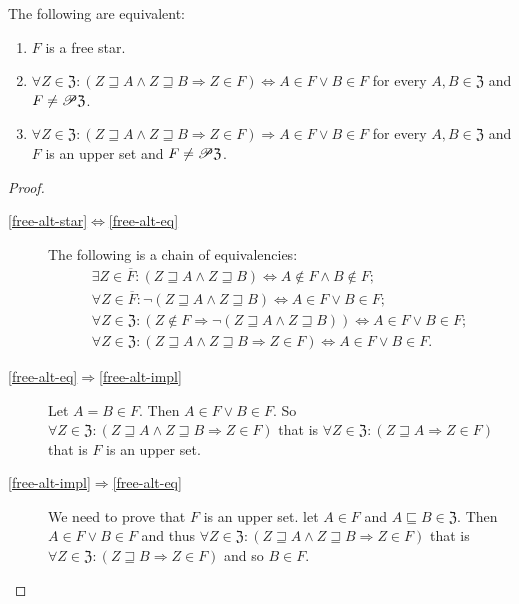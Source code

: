 \begin{prop}
The following are equivalent:
\begin{enumerate}
\item \label{free-alt-star}$F$ is a free star.
\item \label{free-alt-eq}$\forall Z\in\mathfrak{Z}:(Z\sqsupseteq A\wedge Z\sqsupseteq B\Rightarrow Z\in F)\Leftrightarrow A\in F\vee B\in F$
for every $A,B\in\mathfrak{Z}$ and $F\neq\mathscr{P}\mathfrak{Z}$.
\item \label{free-alt-impl}$\forall Z\in\mathfrak{Z}:(Z\sqsupseteq A\wedge Z\sqsupseteq B\Rightarrow Z\in F)\Rightarrow A\in F\vee B\in F$
for every $A,B\in\mathfrak{Z}$ and $F$ is an upper set and $F\neq\mathscr{P}\mathfrak{Z}$.
\end{enumerate}
\end{prop}
\begin{proof}
~
\begin{description}
\item [{\ref{free-alt-star}$\Leftrightarrow$\ref{free-alt-eq}}] The following
is a chain of equivalencies:
\begin{gather*}
\exists Z\in\overline{F}:(Z\sqsupseteq A\wedge Z\sqsupseteq B)\Leftrightarrow A\notin F\wedge B\notin F;\\
\forall Z\in\overline{F}:\neg(Z\sqsupseteq A\wedge Z\sqsupseteq B)\Leftrightarrow A\in F\vee B\in F;\\
\forall Z\in\mathfrak{Z}:(Z\notin F\Rightarrow\neg(Z\sqsupseteq A\wedge Z\sqsupseteq B))\Leftrightarrow A\in F\vee B\in F;\\
\forall Z\in\mathfrak{Z}:(Z\sqsupseteq A\wedge Z\sqsupseteq B\Rightarrow Z\in F)\Leftrightarrow A\in F\vee B\in F.
\end{gather*}

\item [{\ref{free-alt-eq}$\Rightarrow$\ref{free-alt-impl}}]
Let $A=B\in F$. Then $A\in F\lor B\in F$. So $\forall Z\in\mathfrak{Z}:(Z\sqsupseteq A\wedge Z\sqsupseteq B\Rightarrow Z\in F)$
that is $\forall Z\in\mathfrak{Z}:(Z\sqsupseteq A\Rightarrow Z\in F)$ that is $F$ is an upper set.

\item [{\ref{free-alt-impl}$\Rightarrow$\ref{free-alt-eq}}] We need
to prove that $F$ is an upper set. let $A\in F$ and $A\sqsubseteq B\in\mathfrak{Z}$.
Then $A\in F\lor B\in F$ and thus $\forall Z\in\mathfrak{Z}:(Z\sqsupseteq A\wedge Z\sqsupseteq B\Rightarrow Z\in F)$
that is $\forall Z\in\mathfrak{Z}:(Z\sqsupseteq B\Rightarrow Z\in F)$
and so $B\in F$.
\end{description}
\end{proof}
